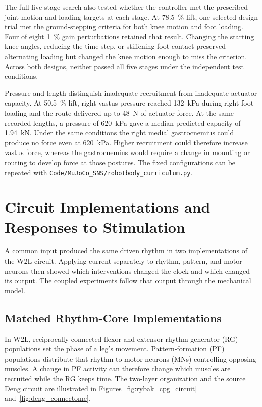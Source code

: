 The full five-stage search also tested whether the controller met the prescribed joint-motion and loading targets at each stage. At \qty{78.5}{\percent} lift, one selected-design trial met the ground-stepping criteria for both knee motion and foot loading. Four of eight \qty{1}{\percent} gain perturbations retained that result. Changing the starting knee angles, reducing the time step, or stiffening foot contact preserved alternating loading but changed the knee motion enough to miss the criterion. Across both designs, neither passed all five stages under the independent test conditions.

Pressure and length distinguish inadequate recruitment from inadequate actuator capacity. At \qty{50.5}{\percent} lift, right vastus pressure reached \qty{132}{\kPa} during right-foot loading and the route delivered up to \qty{48}{\newton} of actuator force. At the same recorded lengths, a pressure of \qty{620}{\kPa} gave a median predicted capacity of \qty{1.94}{\kilo\newton}. Under the same conditions the right medial gastrocnemius could produce no force even at \qty{620}{\kPa}. Higher recruitment could therefore increase vastus force, whereas the gastrocnemius would require a change in mounting or routing to develop force at those postures. The fixed configurations can be repeated with \nolinkurl{Code/MuJoCo_SNS/robotbody_curriculum.py}.

\section{Circuit Implementations and Responses to Stimulation}\label{sec:sns_ports}\label{sec:crossengine_methods}

A common input produced the same driven rhythm in two implementations of the W2L circuit. Applying current separately to rhythm, pattern, and motor neurons then showed which interventions changed the clock and which changed its output. The coupled experiments follow that output through the mechanical model.

\subsection{Matched Rhythm-Core Implementations}

In W2L, reciprocally connected flexor and extensor rhythm-generator (RG) populations set the phase of a leg's movement. Pattern-formation (PF) populations distribute that rhythm to motor neurons (MNs) controlling opposing muscles. A change in PF activity can therefore change which muscles are recruited while the RG keeps time. The two-layer organization and the source Deng circuit are illustrated in Figures~\ref{fig:rybak_cpg_circuit} and~\ref{fig:deng_connectome}.

